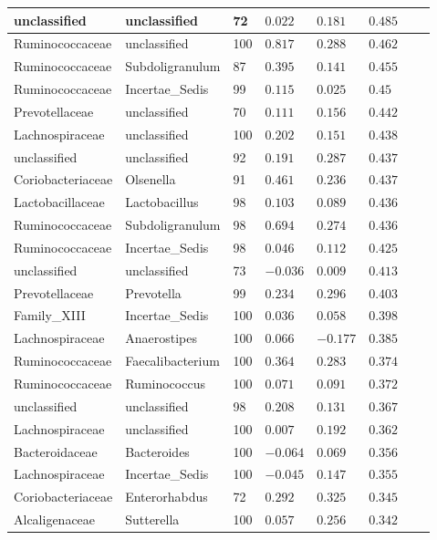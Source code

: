 \begin{table}[!ht]
\begin{tiny}
\begin{tabular}{|l|l|l|l|l|l|l|l|}
unclassified & unclassified & 72 & $0.022$ & $0.181$ & $0.485$ \\ \hline
Ruminococcaceae & unclassified & 100 & $0.817$ & $0.288$ & $0.462$ \\ \hline
Ruminococcaceae & Subdoligranulum & 87 & $0.395$ & $0.141$ & $0.455$ \\ \hline
Ruminococcaceae & Incertae_Sedis & 99 & $0.115$ & $0.025$ & $0.45$ \\ \hline
Prevotellaceae & unclassified & 70 & $0.111$ & $0.156$ & $0.442$ \\ \hline
Lachnospiraceae & unclassified & 100 & $0.202$ & $0.151$ & $0.438$ \\ \hline
unclassified & unclassified & 92 & $0.191$ & $0.287$ & $0.437$ \\ \hline
Coriobacteriaceae & Olsenella & 91 & $0.461$ & $0.236$ & $0.437$ \\ \hline
Lactobacillaceae & Lactobacillus & 98 & $0.103$ & $0.089$ & $0.436$ \\ \hline
Ruminococcaceae & Subdoligranulum & 98 & $0.694$ & $0.274$ & $0.436$ \\ \hline
Ruminococcaceae & Incertae_Sedis & 98 & $0.046$ & $0.112$ & $0.425$ \\ \hline
unclassified & unclassified & 73 & $-0.036$ & $0.009$ & $0.413$ \\ \hline
Prevotellaceae & Prevotella & 99 & $0.234$ & $0.296$ & $0.403$ \\ \hline
Family_XIII & Incertae_Sedis & 100 & $0.036$ & $0.058$ & $0.398$ \\ \hline
Lachnospiraceae & Anaerostipes & 100 & $0.066$ & $-0.177$ & $0.385$ \\ \hline
Ruminococcaceae & Faecalibacterium & 100 & $0.364$ & $0.283$ & $0.374$ \\ \hline
Ruminococcaceae & Ruminococcus & 100 & $0.071$ & $0.091$ & $0.372$ \\ \hline
unclassified & unclassified & 98 & $0.208$ & $0.131$ & $0.367$ \\ \hline
Lachnospiraceae & unclassified & 100 & $0.007$ & $0.192$ & $0.362$ \\ \hline
Bacteroidaceae & Bacteroides & 100 & $-0.064$ & $0.069$ & $0.356$ \\ \hline
Lachnospiraceae & Incertae_Sedis & 100 & $-0.045$ & $0.147$ & $0.355$ \\ \hline
Coriobacteriaceae & Enterorhabdus & 72 & $0.292$ & $0.325$ & $0.345$ \\ \hline
Alcaligenaceae & Sutterella & 100 & $0.057$ & $0.256$ & $0.342$ \\ \hline

\end{tabular}
\end{tiny}
\end{table}
